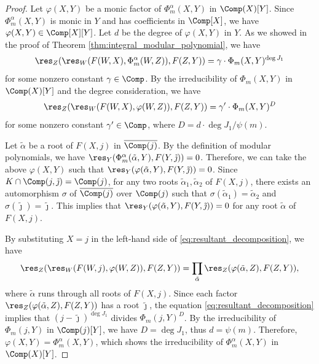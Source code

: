 \documentclass{amsart}
\theoremstyle{definition}
\theoremstyle{remark}
\numberwithin{equation}{section}
\begin{document}
\begin{proof}
    Let $\varphi(X, Y)$ be a monic factor of $\Phi_m^\alpha(X, Y)$
    in $\Comp(X)[Y]$.
    Since $\Phi_m^\alpha(X, Y)$ is monic in $Y$ and has coefficients in $\Comp[X]$,
    we have $\varphi(X, Y) \in \Comp[X][Y]$.
    Let $d$ be the degree of $\varphi(X, Y)$ in $Y$.
    As we showed in the proof of Theorem \ref{thm:integral_modular_polynomial},
    we have
    \begin{equation*}
        \res_Z(\res_W(F(W, X), \Phi_m^\alpha(W, Z)), F(Z, Y)) = \gamma\cdot\Phi_m(X, Y)^{\deg J_1}
    \end{equation*}
    for some nonzero constant $\gamma \in \Comp$.
    By the irreducibility of $\Phi_m(X, Y)$ in $\Comp(X)[Y]$
    and the degree consideration,
    we have
    \begin{equation}\label{eq:resultant_decomposition}
        \res_Z(\res_W(F(W, X), \varphi(W, Z)), F(Z, Y)) = \gamma'\cdot\Phi_m(X, Y)^D
    \end{equation}
    for some nonzero constant $\gamma' \in \Comp$,
    where $D = d \cdot \deg J_1 / \psi(m)$.

    Let $\tilde{\alpha}$ be a root of $F(X, j)$ in $\overline{\Comp(j)}$.
    By the definition of modular polynomials,
    we have $\res_Y(\Phi_m^\alpha(\tilde{\alpha}, Y), F(Y, \tilde{\jmath})) = 0$.
    Therefore, we can take the above $\varphi(X, Y)$
    such that $\res_Y(\varphi(\tilde{\alpha}, Y), F(Y, \tilde{\jmath})) = 0$.
    Since $K \cap \Comp(j, \tilde{\jmath}) = \Comp(j)$,
    for any two roots $\tilde{\alpha}_1, \tilde{\alpha}_2$ of $F(X, j)$,
    there exists an automorphism $\sigma$ of $\overline{\Comp(j)}$ over $\Comp(j)$
    such that $\sigma(\tilde{\alpha}_1) = \tilde{\alpha}_2$ and $\sigma(\tilde{\jmath}) = \tilde{\jmath}$.
    This implies that
    $\res_Y(\varphi(\tilde{\alpha}, Y), F(Y, \tilde{\jmath})) = 0$
    for any root $\tilde{\alpha}$ of $F(X, j)$.

    By substituting $X = j$ in the left-hand side of \eqref{eq:resultant_decomposition},
    we have
    \begin{equation*}
        \res_Z(\res_W(F(W, j), \varphi(W, Z)), F(Z, Y)) = \prod_{\tilde{\alpha}} \res_Z(\varphi(\tilde{\alpha}, Z), F(Z, Y)),
    \end{equation*}
    where $\tilde{\alpha}$ runs through all roots of $F(X, j)$.
    Since each factor $\res_Z(\varphi(\tilde{\alpha}, Z), F(Z, Y))$ has a root $\tilde{\jmath}$,
    the equation \eqref{eq:resultant_decomposition} implies that
    $(j - \tilde{\jmath})^{\deg J_1}$ divides $\Phi_m(j, Y)^D$.
    By the irreducibility of $\Phi_m(j, Y)$ in $\Comp(j)[Y]$,
    we have $D = \deg J_1$, thus $d = \psi(m)$.
    Therefore, $\varphi(X, Y) = \Phi_m^\alpha(X, Y)$,
    which shows the irreducibility of $\Phi_m^\alpha(X, Y)$ in $\Comp(X)[Y]$.
\end{proof}
\end{document}
